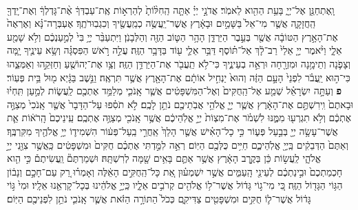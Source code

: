 \documentclass[twoside, openany, parskip=half, 11pt]{book}
\begin{document}
\begin{footnotesize}
\begin{multicols}{2}
\\
 וָֽאֶתְחַנַּ֖ן אֶל־יְיָ֑ בָּעֵ֥ת הַהִ֖וא לֵאמֹֽר׃ אֲדֹנָ֣י יְיָ֗ אַתָּ֤ה הַֽחִלּ֨וֹתָ֙ לְהַרְא֣וֹת אֶֽת־עַבְדְּךָ֔ אֶ֨ת־גָּדְלְךָ֔ וְאֶת־יָֽדְךָ֖ הַֽחֲזָקָ֑ה אֲשֶׁ֤ר מִי־אֵל֙ בַּשָּׁמַ֣יִם וּבָאָ֔רֶץ אֲשֶׁר־יַֽעֲשֶׂ֥ה כְמַֽעֲשֶׂ֖יךָ וְכִגְבֽוּרֹתֶֽךָ׃ אֶעְבְּרָה־נָּ֗א וְאֶרְאֶה֙ אֶת־הָאָ֣רֶץ הַטּוֹבָ֔ה אֲשֶׁ֖ר בְּעֵ֣בֶר הַיַּרְדֵּ֑ן הָהָ֥ר הַטּ֛וֹב הַזֶּ֖ה וְהַלְּבָנֹֽן׃  וַיִּתְעַבֵּ֨ר יְיָ֥ בִּי֙ לְמַ֣עַנְכֶ֔ם וְלֹ֥א שָׁמַ֖ע אֵלָ֑י וַיֹּ֨אמֶר יְיָ֤ אֵלַי֙ רַב־לָ֔ךְ אַל־תּ֗וֹסֶף דַּבֵּ֥ר אֵלַ֛י ע֖וֹד בַּדָּבָ֥ר הַזֶּֽה׃ עֲלֵ֣ה רֹ֣אשׁ הַפִּסְגָּ֗ה וְשָׂ֥א עֵינֶ֛יךָ יָ֧מָּה וְצָפֹ֛נָה וְתֵימָ֥נָה וּמִזְרָ֖חָה וּרְאֵ֣ה בְעֵינֶ֑יךָ כִּי־לֹ֥א תַֽעֲבֹ֖ר אֶת־הַיַּרְדֵּ֥ן הַזֶּֽה׃ וְצַ֥ו אֶת־יְהוֹשֻׁ֖עַ וְחַזְּקֵ֣הוּ וְאַמְּצֵ֑הוּ כִּי־ה֣וּא יַֽעֲבֹ֗ר לִפְנֵי֙ הָעָ֣ם הַזֶּ֔ה וְהוּא֙ יַנְחִ֣יל אוֹתָ֔ם אֶת־הָאָ֖רֶץ אֲשֶׁ֥ר תִּרְאֶֽה׃ וַנֵּ֣שֶׁב בַּגָּ֔יְא מ֖וּל בֵּ֥ית פְּעֽוֹר׃ \textbf{פ} 
וְעַתָּ֣ה יִשְׂרָאֵ֗ל שְׁמַ֤ע אֶל־הַֽחֻקִּים֙ וְאֶל־הַמִּשְׁפָּטִ֔ים אֲשֶׁ֧ר אָֽנֹכִ֛י מְלַמֵּ֥ד אֶתְכֶ֖ם לַֽעֲשׂ֑וֹת לְמַ֣עַן תִּֽחְי֗וּ וּבָאתֶם֙ וִֽירִשְׁתֶּ֣ם אֶת־הָאָ֔רֶץ אֲשֶׁ֧ר יְיָ֛ אֱלֹהֵ֥י אֲבֹֽתֵיכֶ֖ם נֹתֵ֥ן לָכֶֽם׃ לֹ֣א תֹסִ֗פוּ עַל־הַדָּבָר֙ אֲשֶׁ֤ר אָֽנֹכִי֙ מְצַוֶּ֣ה אֶתְכֶ֔ם וְלֹ֥א תִגְרְע֖וּ מִמֶּ֑נּוּ לִשְׁמֹ֗ר אֶת־מִצְוֹת֙ יְיָ֣ אֱלֹֽהֵיכֶ֔ם אֲשֶׁ֥ר אָֽנֹכִ֖י מְצַוֶּ֥ה אֶתְכֶֽם׃ עֵֽינֵיכֶם֙ הָֽרֹא֔וֹת אֵ֛ת אֲשֶׁר־עָשָׂ֥ה יְיָ֖ בְּבַ֣עַל פְּע֑וֹר כִּ֣י כָל־הָאִ֗ישׁ אֲשֶׁ֤ר הָלַךְ֙ אַֽחֲרֵ֣י בַֽעַל־פְּע֔וֹר הִשְׁמִיד֛וֹ יְיָ֥ אֱלֹהֶ֖יךָ מִקִּרְבֶּֽךָ׃ וְאַתֶּם֙ הַדְּבֵקִ֔ים בַּֽיְיָ֖ אֱלֹֽהֵיכֶ֑ם חַיִּ֥ים כֻּלְּכֶ֖ם הַיּֽוֹם׃  רְאֵ֣ה לִמַּ֣דְתִּי אֶתְכֶ֗ם חֻקִּים֙ וּמִשְׁפָּטִ֔ים כַּֽאֲשֶׁ֥ר צִוַּ֖נִי יְיָ֣ אֱלֹהָ֑י לַֽעֲשׂ֣וֹת כֵּ֔ן בְּקֶ֣רֶב הָאָ֔רֶץ אֲשֶׁ֥ר אַתֶּ֛ם בָּאִ֥ים שָׁ֖מָּה לְרִשְׁתָּֽהּ׃ וּשְׁמַרְתֶּם֘ וַֽעֲשִׂיתֶם֒ כִּ֣י הִ֤וא חָכְמַתְכֶם֙ וּבִ֣ינַתְכֶ֔ם לְעֵינֵ֖י הָֽעַמִּ֑ים אֲשֶׁ֣ר יִשְׁמְע֗וּן אֵ֚ת כָּל־הַֽחֻקִּ֣ים הָאֵ֔לֶּה וְאָמְר֗וּ רַ֚ק עַם־חָכָ֣ם וְנָב֔וֹן הַגּ֥וֹי הַגָּד֖וֹל הַזֶּֽה׃ כִּ֚י מִי־ג֣וֹי גָּד֔וֹל אֲשֶׁר־ל֥וֹ אֱלֹהִ֖ים קְרֹבִ֣ים אֵלָ֑יו כַּֽיְיָ֣ אֱלֹהֵ֔ינוּ בְּכָל־קָרְאֵ֖נוּ אֵלָֽיו׃ וּמִי֙ גּ֣וֹי גָּד֔וֹל אֲשֶׁר־ל֛וֹ חֻקִּ֥ים וּמִשְׁפָּטִ֖ים צַדִּיקִ֑ם כְּכֹל֙ הַתּוֹרָ֣ה הַזֹּ֔את אֲשֶׁ֧ר אָֽנֹכִ֛י נֹתֵ֥ן לִפְנֵיכֶ֖ם הַיּֽוֹם׃


\end{multicols}
\end{footnotesize}
\end{document}
